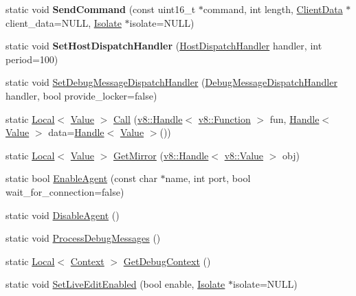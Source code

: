 \begin{DoxyCompactItemize}
\item 
\hypertarget{classv8_1_1_debug_a3fe024335cf785f8df1f072a9aea3555}{}static void {\bfseries Send\+Command} (const uint16\+\_\+t $\ast$command, int length, \hyperlink{classv8_1_1_debug_1_1_client_data}{Client\+Data} $\ast$client\+\_\+data=N\+U\+L\+L, \hyperlink{classv8_1_1_isolate}{Isolate} $\ast$isolate=N\+U\+L\+L)\label{classv8_1_1_debug_a3fe024335cf785f8df1f072a9aea3555}

\item 
\hypertarget{classv8_1_1_debug_aa55c29d5cc7b04c4fc24cd89c77f3f54}{}static void {\bfseries Set\+Host\+Dispatch\+Handler} (\hyperlink{classv8_1_1_debug_a442f686afe7d80928b57b3ff8ac3f6e7}{Host\+Dispatch\+Handler} handler, int period=100)\label{classv8_1_1_debug_aa55c29d5cc7b04c4fc24cd89c77f3f54}

\item 
static void \hyperlink{classv8_1_1_debug_a5147f6cfeb9b87a67630b8c959996e9c}{Set\+Debug\+Message\+Dispatch\+Handler} (\hyperlink{classv8_1_1_debug_a91cd8aa9743e3478bc63fe73abcd557c}{Debug\+Message\+Dispatch\+Handler} handler, bool provide\+\_\+locker=false)
\item 
static \hyperlink{classv8_1_1_local}{Local}$<$ \hyperlink{classv8_1_1_value}{Value} $>$ \hyperlink{classv8_1_1_debug_a49a3e0cf585cfd201d8ab1bc395d0593}{Call} (\hyperlink{classv8_1_1_handle}{v8\+::\+Handle}$<$ \hyperlink{classv8_1_1_function}{v8\+::\+Function} $>$ fun, \hyperlink{classv8_1_1_handle}{Handle}$<$ \hyperlink{classv8_1_1_value}{Value} $>$ data=\hyperlink{classv8_1_1_handle}{Handle}$<$ \hyperlink{classv8_1_1_value}{Value} $>$())
\item 
static \hyperlink{classv8_1_1_local}{Local}$<$ \hyperlink{classv8_1_1_value}{Value} $>$ \hyperlink{classv8_1_1_debug_aa7d07c7d5c9ee2eaaa9af310bcbf58f5}{Get\+Mirror} (\hyperlink{classv8_1_1_handle}{v8\+::\+Handle}$<$ \hyperlink{classv8_1_1_value}{v8\+::\+Value} $>$ obj)
\item 
static bool \hyperlink{classv8_1_1_debug_a78506e80b599010624c5fcde72a643a7}{Enable\+Agent} (const char $\ast$name, int port, bool wait\+\_\+for\+\_\+connection=false)
\item 
static void \hyperlink{classv8_1_1_debug_aa9b8f5fe4545f52f5937d61e972dcbf0}{Disable\+Agent} ()
\item 
static void \hyperlink{classv8_1_1_debug_a888e06766caee0380c6aa010b00e1a54}{Process\+Debug\+Messages} ()
\item 
static \hyperlink{classv8_1_1_local}{Local}$<$ \hyperlink{classv8_1_1_context}{Context} $>$ \hyperlink{classv8_1_1_debug_a2343a321b0db41324b7e8a7402f57cf0}{Get\+Debug\+Context} ()
\item 
static void \hyperlink{classv8_1_1_debug_a36c91138cdc2468a6ca019db243ed19f}{Set\+Live\+Edit\+Enabled} (bool enable, \hyperlink{classv8_1_1_isolate}{Isolate} $\ast$isolate=N\+U\+L\+L)
\end{DoxyCompactItemize}


